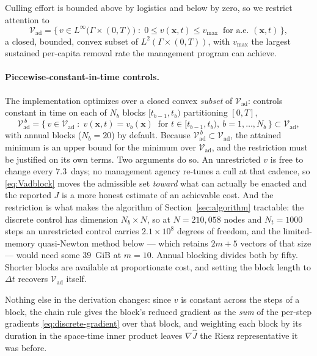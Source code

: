\documentclass[11pt]{article}
\newcommand{\Vad}{\mathcal{V}_{\mathrm{ad}}}
\begin{document}
Culling effort is bounded above by logistics and below by zero, so we restrict attention to
\begin{equation}
\Vad = \Big\{\,v\in L^\infty\big(\Gamma\times(0,T)\big)\;:\;0\le v(\mathbf{x},t)\le v_{\max}\ \text{ for a.e. }(\mathbf{x},t)\,\Big\},
\end{equation}
a closed, bounded, convex subset of $L^2(\Gamma\times(0,T))$, with $v_{\max}$ the largest sustained per-capita removal rate the management program can achieve.

\paragraph{Piecewise-constant-in-time controls.} The implementation optimizes over a closed convex \emph{subset} of $\Vad$: controls constant in time on each of $N_b$ blocks $[t_{b-1},t_b)$ partitioning $[0,T]$,
\begin{equation}
\Vad^{\,b} = \Big\{\,v\in\Vad \;:\; v(\mathbf{x},t) = v_b(\mathbf{x})\ \text{ for } t\in[t_{b-1},t_b),\ b=1,\dots,N_b \,\Big\} \subset \Vad,
\label{eq:Vadblock}
\end{equation}
with annual blocks ($N_b = 20$) by default. Because $\Vad^{\,b}\subset\Vad$, the attained minimum is an upper bound for the minimum over $\Vad$, and the restriction must be justified on its own terms. Two arguments do so. An unrestricted $v$ is free to change every $7.3$~days; no management agency re-tunes a cull at that cadence, so \eqref{eq:Vadblock} moves the admissible set \emph{toward} what can actually be enacted and the reported $J$ is a more honest estimate of an achievable cost. And the restriction is what makes the algorithm of Section~\ref{sec:algorithm} tractable: the discrete control has dimension $N_b\times N$, so at $N = 210{,}058$ nodes and $N_t = 1000$ steps an unrestricted control carries $2.1\times10^8$ degrees of freedom, and the limited-memory quasi-Newton method below --- which retains $2m+5$ vectors of that size --- would need some $39$~GiB at $m=10$. Annual blocking divides both by fifty. Shorter blocks are available at proportionate cost, and setting the block length to $\Delta t$ recovers $\Vad$ itself.

Nothing else in the derivation changes: since $v$ is constant across the steps of a block, the chain rule gives the block's reduced gradient as the \emph{sum} of the per-step gradients \eqref{eq:discrete-gradient} over that block, and weighting each block by its duration in the space-time inner product leaves $\nabla\hat J$ the Riesz representative it was before.
\end{document}
